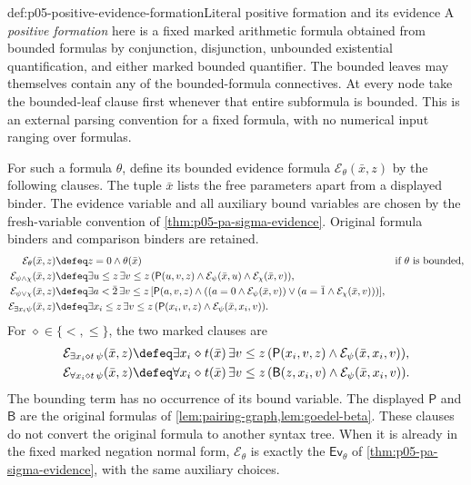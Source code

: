 \begin{hbdefinition}{def:p05-positive-evidence-formation}{Literal positive formation and its evidence}
A \emph{positive formation} here is a fixed marked arithmetic formula
obtained from bounded formulas by conjunction, disjunction, unbounded
existential quantification, and either marked bounded quantifier. The
bounded leaves may themselves contain any of the bounded-formula
connectives. At every node take the bounded-leaf clause first whenever
that entire subformula is bounded. This is an external parsing convention
for a fixed formula, with no numerical input ranging over formulas.

For such a formula \(\theta\), define its bounded evidence formula
\(\mathcal E_\theta(\bar x,z)\) by the following clauses. The tuple
\(\bar x\) lists the free parameters apart from a displayed binder.
The evidence variable and all auxiliary bound variables are chosen by
the fresh-variable convention of \cref{thm:p05-pa-sigma-evidence}.
Original formula binders and comparison binders are retained.
\[
\begin{aligned}
 \mathcal E_\theta(\bar x,z)
   &\defeq z=0\land\theta(\bar x)
                         &&\text{if \(\theta\) is bounded},\\
 \mathcal E_{\psi\land\chi}(\bar x,z)
   &\defeq\exists u\leq z\,\exists v\leq z\,
       (\mathsf P(u,v,z)\land\mathcal E_\psi(\bar x,u)
                              \land\mathcal E_\chi(\bar x,v)),\\
 \mathcal E_{\psi\lor\chi}(\bar x,z)
   &\defeq\exists a<\bar2\,\exists v\leq z\,
       [\mathsf P(a,v,z)\land
        ((a=0\land\mathcal E_\psi(\bar x,v))
          \lor(a=\bar1\land\mathcal E_\chi(\bar x,v)))],\\
 \mathcal E_{\exists x_i\psi}(\bar x,z)
   &\defeq\exists x_i\leq z\,\exists v\leq z\,
        (\mathsf P(x_i,v,z)\land\mathcal E_\psi(\bar x,x_i,v)).
\end{aligned}
\]
For \(\diamond\in\{<,\leq\}\), the two marked clauses are
\[
\begin{aligned}
 \mathcal E_{\exists x_i\mathrel\diamond t\,\psi}(\bar x,z)
  &\defeq\exists x_i\mathrel\diamond t(\bar x)\,
       \exists v\leq z\,
       (\mathsf P(x_i,v,z)\land\mathcal E_\psi(\bar x,x_i,v)),\\
 \mathcal E_{\forall x_i\mathrel\diamond t\,\psi}(\bar x,z)
  &\defeq\forall x_i\mathrel\diamond t(\bar x)\,
       \exists v\leq z\,
       (\mathsf B(z,x_i,v)\land\mathcal E_\psi(\bar x,x_i,v)).
\end{aligned}
\]
The bounding term has no occurrence of its bound variable. The displayed
\(\mathsf P\) and \(\mathsf B\) are the original formulas of
\cref{lem:pairing-graph,lem:goedel-beta}. These clauses do not convert
the original formula to another syntax tree. When it is already in the
fixed marked negation normal form, \(\mathcal E_\theta\) is exactly
the \(\mathsf{Ev}_\theta\) of
\cref{thm:p05-pa-sigma-evidence}, with the same auxiliary choices.


\end{hbdefinition}
